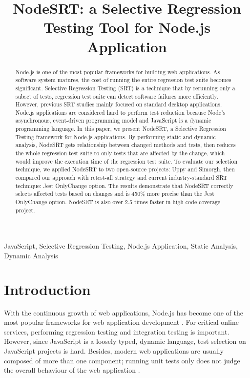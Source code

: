 \documentclass[10pt, conference]{IEEEtran}
\begin{document}
\title{NodeSRT: a Selective Regression Testing Tool for Node.js Application}

\author{
}

\maketitle

\begin{abstract}
Node.js is one of the most popular frameworks for building web applications. As software system 
matures, the cost of running the entire regression test suite becomes significant. 
Selective Regression Testing (SRT) is a technique that by rerunning only a subset of tests, regression test suite can detect software failures more efficiently. 
However, previous SRT studies mainly focused on standard desktop applications. Node.js applications are 
considered hard to perform test reduction because Node's asynchronous, event-driven programming model and 
JavaScript is a dynamic programming language. 
In this paper, we present NodeSRT, a Selective Regression Testing framework for Node.js applications. 
By performing static and dynamic analysis, NodeSRT gets relationship between changed methods and tests, 
then reduces the whole regression test suite to only tests that are 
affected by the change, which would improve the execution time of the regression test suite. 
To evaluate our selection technique, we applied NodeSRT to two open-source projects: Uppy and Simorgh, 
then compared our approach with retest-all strategy and current industry-standard SRT technique: Jest 
OnlyChange option. The results demonstrate that NodeSRT correctly selects affected tests based on 
changes and is 450\% more precise than the Jest OnlyChange option. NodeSRT is also over 2.5 times faster in 
high code coverage project.
    
\end{abstract}

\begin{IEEEkeywords}
JavaScript, Selective Regression Testing, Node.js Application, Static Analysis, Dynamic Analysis
\end{IEEEkeywords}

\section{Introduction}
With the continuous growth of web applications, Node.js has become one of the most popular frameworks 
for web application development \cite{b16}. For critical online services, performing regression testing and integration testing is important. However, 
since JavaScript is a loosely typed, dynamic language, test 
selection on JavaScript projects is hard. Besides, modern web applications are usually composed of 
more than one component; running unit tests only does not judge the overall behaviour of the web 
application \cite{b8}. 
\end{document}
